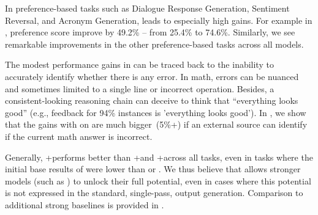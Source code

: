 In preference-based tasks such as Dialogue Response Generation, Sentiment Reversal, and Acronym Generation, \ours leads to especially high gains. 
For example in \dialgen, \gptf preference score improve by 49.2\% -- from 25.4\% to 74.6\%.
Similarly, we see remarkable improvements in the other preference-based tasks across all models. 

The modest performance gains in \gsm can be traced back to the inability to accurately identify whether there is any error. In math, errors can be nuanced and sometimes limited to a single line or incorrect operation. Besides, a consistent-looking  reasoning chain can deceive \llms to think that ``everything looks good'' (e.g., \chatgpt feedback for 94\% instances is 'everything looks good'). In , we show that the gains with \ours on \gsm are much bigger~(5\%+) if an external source can identify if the current math answer is incorrect.



Generally, \gptf{}+\ours performs better than \gptt{}+\ours and \chatgpt{}+\ours across all tasks, even in tasks where the initial base results of \gptf were lower than \gptt or \chatgpt. We thus believe that \ours allows stronger models (such as \gptf) to unlock their full potential, even in cases where this potential is not expressed in the standard, single-pass, output generation.
Comparison to additional strong baselines is provided in .



